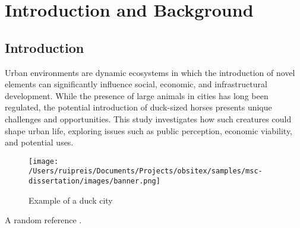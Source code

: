 \documentclass[12pt,a4paper]{report}
\author{Your Name Here}
\begin{document}
\setlength{\parindent}{0em}




\setlength{\parskip}{0pt}
\setlength{\parindent}{1.5em}






\tableofcontents

\cleardoublepage
\listoffigures

\renewcommand*{\listtablename}{List of Tables}
\listoftables
\clearpage

\printglossary[type=\acronymtype,nonumberlist, title={Acronyms}]

\printglossary[title={Glossary}, nonumberlist]

\cleardoublepage
{}

\part{Introduction and Background}\label{sec:Introduction_and_Background}

\chapter{Introduction}\label{sec:Introduction}

Urban environments are dynamic ecosystems in which the introduction of novel elements can significantly influence social, economic, and infrastructural development. While the presence of large animals in cities has long been regulated, the potential introduction of duck-sized horses presents unique challenges and opportunities. This study investigates how such creatures could shape urban life, exploring issues such as public perception, economic viability, and potential uses.



\begin{figure}[H]
\centering
\texttt{[image: /Users/ruipreis/Documents/Projects/obsitex/samples/msc-dissertation/images/banner.png]}
\caption{Example of a duck city}
\end{figure}


A random reference \citep{weiFinetunedLanguageModels2022}.
\end{document}
